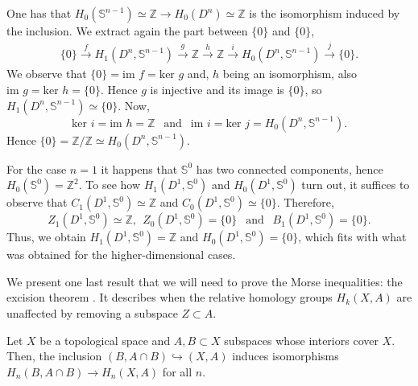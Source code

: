 \begin{example}

One has that $H_{0}(\mathbb{S}^{n-1})\simeq \mathbb{Z}\to H_{0}(D^n)\simeq \mathbb{Z}$ is the isomorphism induced by the inclusion. We extract again the part between $\{0\}$ and $\{0\}$,
\begin{align*}
    \{0\}\overset{f}{\longrightarrow} H_1(D^n,\mathbb{S}^{n-1}) \overset{g}{\longrightarrow} \mathbb{Z} \overset{h}{\longrightarrow} \mathbb{Z} \overset{i}{\longrightarrow} H_0(D^n,\mathbb{S}^{n-1}) \overset{j}{\longrightarrow} \{0\}.
\end{align*}
We observe that $\{0\} = \text{im }f = \text{ker }g$ and, $h$ being an isomorphism, also $\text{im }g = \text{ker }h = \{0\}$. Hence $g$ is injective and its image is $\{0\}$, so $H_1(D^n,\mathbb{S}^{n-1})\simeq\{0\}$. Now,
\begin{equation*}
    \text{ker }i = \text{im }h = \mathbb{Z} ~~\text{ and }~~ \text{im }i = \text{ker }j = H_0(D^n,\mathbb{S}^{n-1}).
\end{equation*}
Hence $\{0\}=\mathbb{Z}/\mathbb{Z}\simeq H_0(D^n,\mathbb{S}^{n-1})$.

For the case $n=1$ it happens that $\mathbb{S}^0$ has two connected components, hence $H_0(\mathbb{S}^0)=\mathbb{Z}^2$. To see how $H_1(D^1,\mathbb{S}^{0})$ and $H_0(D^1,\mathbb{S}^{0})$ turn out, it suffices to observe that $C_1(D^1,\mathbb{S}^0)\simeq \mathbb{Z}$ and $C_0(D^1,\mathbb{S}^0)\simeq \{0\}$. Therefore,
\begin{equation*}
    Z_1(D^1,\mathbb{S}^0)\simeq \mathbb{Z}, ~~Z_0(D^1,\mathbb{S}^0)=\{0\} ~~\text{ and }~~ B_1(D^1,\mathbb{S}^0)=\{0\}.
\end{equation*}
Thus, we obtain $H_1(D^1,\mathbb{S}^{0})=\mathbb{Z}$ and $H_0(D^1,\mathbb{S}^{0})=\{0\}$, which fits with what was obtained for the higher-dimensional cases.

\end{example}

\bigskip
We present one last result that we will need to prove the Morse inequalities: the excision theorem \cite[p.~119]{hatcher2002}. It describes when the relative homology groups $H_k(X,A)$ are unaffected by removing a subspace $Z\subset A$.

\begin{theorem}
\label{escision}
    Let $X$ be a topological space and $A,B\subset X$ subspaces whose interiors cover $X$. Then, the inclusion $(B,A\cap B)\hookrightarrow (X,A)$ induces isomorphisms $H_n(B,A\cap B)\to H_n(X,A)$ for all $n$.
\end{theorem}


